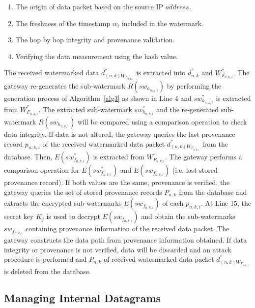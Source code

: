 \documentclass{llncs}
\begin{document}
\begin{enumerate}
    \vspace{0.1cm}
    
    \begin{enumerate}
    \setlength{\itemsep}{5pt}
        \item The origin of data packet based on the source IP $address$.
        \item The freshness of the timestamp $w_{t}$ included in the watermark.
        \item The hop by hop integrity and provenance validation.
        \item Verifying the data measurement using the hash value.
    \end{enumerate}
    
    \vspace{0.1cm}
    
    The received watermarked data $d^{''}_{(n,k)W_{F_{n,k,i}}}$ is extracted into $d^{''}_{n,k}$ and $W^{''}_{F_{n,k,i}}$. The gateway re-generates the sub-watermark $R(sw_{h_{n,k,i}})$ by performing the generation process of Algorithm~\ref{alg3} as shown in Line 4 and $sw^{''}_{h_{n,k,i}}$ is extracted from $W^{''}_{F_{n,k,i}}$. The extracted sub-watermark $sw^{''}_{h_{n,k,i}}$ and the re-generated sub-watermark $R(sw_{h_{n,k,i}})$ will be compared using a comparison operation to check data integrity. If data is not altered, the gateway queries the last provenance record $p_{n,k,i}$ of the received watermarked data packet $d^{''}_{(n,k)W_{F_{n,k,i}}}$ from the database. Then, $E(sw^{''}_{f_{n,k,i}})$ is extracted from $W^{''}_{F_{n,k,i}}$. The gateway performs a comparison operation for $E(sw^{''}_{f_{n,k,i}})$ and $E(sw_{f_{n,k,i}})$ (i.e. last stored provenance record). If both values are the same, provenance is verified, the gateway queries the set of stored provenance records $P_{n,k}$ from the database and extracts the encrypted sub-watermarks $E(sw_{f_{n,k,i}})$ of each $p_{n,k,i}$. At Line 15, the secret key $K_j$ is used to decrypt $E(sw_{f_{n,k,i}})$ and obtain the sub-watermarks $sw_{f_{n,k,i}}$ containing provenance information of the received data packet. The gateway constructs the data path from provenance information obtained. If data integrity or provenance is not verified, data will be discarded and an attack procedure is performed and $P_{n,k}$ of received watermarked data packet $d^{''}_{(n,k)W_{F_{n,k,i}}}$ is deleted from the database.
    \end{enumerate}
    

    
\subsection{Managing Internal Datagrams}\label{sec:internal}
\end{document}
